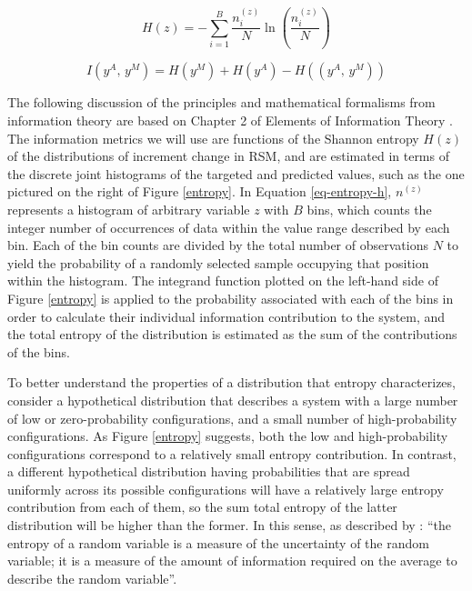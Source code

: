 \begin{equation}\label{eq-entropy-h}
    H(z) = - \sum_{i=1}^B \frac{n^{(z)}_i}{N}\ln\left(\frac{n^{(z)}_i}{N}\right) %
\end{equation}

\begin{equation}\label{eq-entropy-i}
    I(y^A,\,y^M) = H(y^M) + H(y^A) - H((y^A,\,y^M)) %
\end{equation}

The following discussion of the principles and mathematical formalisms from information theory are based on Chapter 2 of Elements of Information Theory \citep{schilling_entropy_2005}. The information metrics we will use are functions of the Shannon entropy $H(z)$ of the distributions of increment change in RSM, and are estimated in terms of the discrete joint histograms of the targeted and predicted values, such as the one pictured on the right of Figure \ref{entropy}. In Equation \ref{eq-entropy-h}, $n^{(z)}$ represents a histogram of arbitrary variable $z$ with $B$ bins, which counts the integer number of occurrences of data within the value range described by each bin. Each of the bin counts are divided by the total number of observations $N$ to yield the probability of a randomly selected sample occupying that position within the histogram. The integrand function plotted on the left-hand side of Figure \ref{entropy} is applied to the probability associated with each of the bins in order to calculate their individual information contribution to the system, and the total entropy of the distribution is estimated as the sum of the contributions of the bins.

To better understand the properties of a distribution that entropy characterizes, consider a hypothetical distribution that describes a system with a large number of low or zero-probability configurations, and a small number of high-probability configurations. As Figure \ref{entropy} suggests, both the low and high-probability configurations correspond to a relatively small entropy contribution. In contrast, a different hypothetical distribution having probabilities that are spread uniformly across its possible configurations will have a relatively large entropy contribution from each of them, so the sum total entropy of the latter distribution will be higher than the former. In this sense, as described by \citep{schilling_entropy_2005}: ``the entropy of a random variable is a measure of the uncertainty of the random variable; it is a measure of the amount of information required on the average to describe the random variable''.

